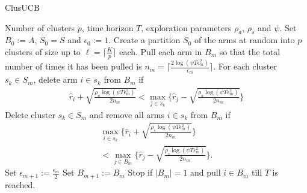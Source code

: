 \begin{algorithm}[!h]
\caption{ClusUCB}
\label{alg:clusucb}
\begin{algorithmic}
 Number of clusters $p$, time horizon $T$, exploration parameters $\rho_a$, $\rho_s$ and $\psi$.
 Set $B_{0}:=A$, $S_0 = S$ and $\epsilon_{0}:=1$.
\State Create a partition $S_0$ of the arms at random into $p$ clusters of size up to $\ell=\bigg\lceil \frac{K}{p} \bigg\rceil$ each.
\State Pull each arm in $B_m$ so that the total number of times it has been pulled is $n_{m}=\bigg\lceil\frac{2\log{(\psi T\epsilon_{m}^{2})}}{\epsilon_{m}}\bigg\rceil$. 
\ArmElim
\State For each cluster $s_k \in S_{m}$, delete arm ${i}\in s_{k}$ from $B_{m}$ if
\begin{align*}
\hat{r}_{i} + \sqrt{\frac{\rho_{a}\log{(\psi T\epsilon_{m}^{2})}}{2 n_{m}}}  < \max_{{j}\in s_{k}}\bigg\lbrace\hat{r}_{j} -\sqrt{\frac{\rho_{a}\log{(\psi T\epsilon_{m}^{2})}}{2 n_{m}}} \bigg\rbrace
\end{align*}
\EndArmElim
\ClusElim
\State Delete cluster $s_{k}\in S_{m}$ and remove all arms $i\in s_{k}$ from $B_{m}$ if 
\begin{align*}
 \max_{{i}\in s_{k}}\bigg\lbrace\hat{r}_{i} + \sqrt{\frac{\rho_{s}\log{(\psi T\epsilon_{m}^{2})}}{2 n_{m}}}\bigg\rbrace  \\
 < \max_{{j}\in B_{m}} \bigg\lbrace\hat{r}_{j} - \sqrt{\frac{\rho_{s} \log{(\psi T\epsilon_{m}^{2})}}{2 n_{m}}}\bigg\rbrace.
\end{align*}
\EndClusElim
\State Set $\epsilon_{m+1}:=\frac{\epsilon_{m}}{2}$\vspace{0.5ex}
\State Set $B_{m+1}:=B_{m}$
\State Stop if $|B_{m}|=1$ and pull ${i}\in B_{m}$ till $T$ is reached.
\EndFor
\end{algorithmic}
\end{algorithm}

